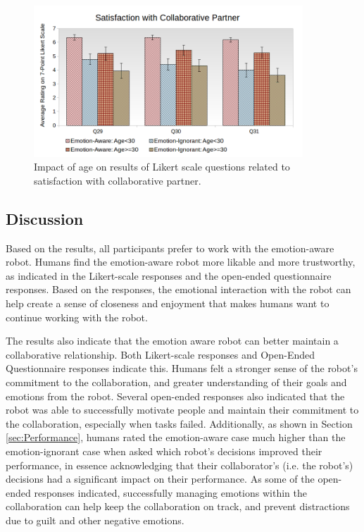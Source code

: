 \documentclass[12pt]{report}
\begin{document}
\begin{figure}[!h]
\centering
\includegraphics[width=0.9\textwidth]{figure/Age-Satisfaction.png}
\caption{Impact of age on results of Likert scale questions related to
satisfaction with collaborative partner.}
\label{fig:age-satisfaction}
\end{figure}

\subsection{Discussion}
Based on the results, all participants prefer to work with the emotion-aware
robot. Humans find the emotion-aware robot more likable and more trustworthy, as
indicated in the Likert-scale responses and the open-ended questionnaire
responses. Based on the responses, the emotional interaction with the robot can
help create a sense of closeness and enjoyment that makes humans want to
continue working with the robot.

The results also indicate that the emotion aware robot can better maintain a
collaborative relationship. Both Likert-scale responses and Open-Ended
Questionnaire responses indicate this. Humans felt a stronger sense of the
robot's commitment to the collaboration, and greater understanding of their
goals and emotions from the robot. Several open-ended responses also indicated
that the robot was able to successfully motivate people and maintain their
commitment to the collaboration, especially when tasks failed. Additionally, as
shown in Section \ref{sec:Performance}, humans rated the emotion-aware case much
higher than the emotion-ignorant case when asked which robot's decisions
improved their performance, in essence acknowledging that their collaborator's
(i.e. the robot's) decisions had a significant impact on their performance. As
some of the open-ended responses indicated, successfully managing emotions
within the collaboration can help keep the collaboration on track, and prevent
distractions due to guilt and other negative emotions.
\end{document}
